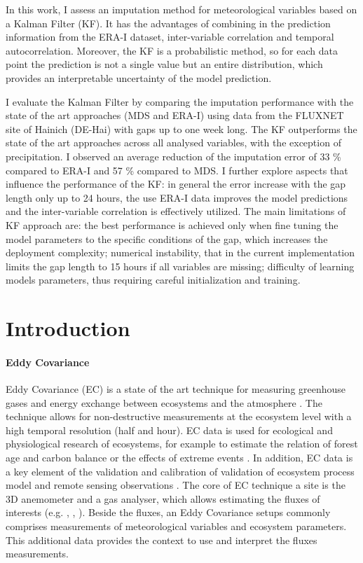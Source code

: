 \documentclass{article}
\let\Oldsection\section
\renewcommand{\section}{\FloatBarrier\Oldsection}
\begin{document}
In this work, I assess an imputation method for meteorological variables based on a Kalman Filter (KF). It has the advantages of combining in the prediction information from the ERA-I dataset, inter-variable correlation and  temporal autocorrelation. Moreover, the KF is a probabilistic method, so for each data point the prediction is not a single value but an entire distribution, which provides an interpretable uncertainty of the model prediction.

I evaluate the Kalman Filter by  comparing the imputation performance with the state of the art approaches (MDS and ERA-I) using data from the FLUXNET site of Hainich (DE-Hai) with gaps up to one week long. The KF outperforms the state of the art approaches across all analysed variables, with the exception of precipitation. I observed an average reduction of the imputation error of 33 \% compared to ERA-I and  57 \% compared to MDS. I further explore aspects that influence the performance of the KF: in general the error increase with the gap length only up to 24 hours, the use ERA-I data improves the model predictions and the inter-variable correlation is effectively utilized.
The main limitations of KF approach are: the best performance is achieved only when fine tuning the model parameters to the specific conditions of the gap, which increases the deployment complexity; numerical instability, that in the current implementation limits the gap length to 15 hours if all variables are missing; difficulty of learning models parameters, thus requiring careful initialization and training.

\section{Introduction}

\paragraph{Eddy Covariance} Eddy Covariance (EC) is a state of the art technique for measuring greenhouse gases and energy exchange between ecosystems and the atmosphere \cite{aubinet_eddy_2012-1}.  The technique allows for non-destructive measurements at the ecosystem level with a high temporal resolution (half and hour). EC data is used for ecological and physiological research of ecosystems, for example to estimate the relation of forest age and carbon balance \cite{besnard_quantifying_2018} or the effects of extreme events \cite{mahecha_detecting_2017}. In addition, EC data is a key element of the validation and calibration of validation of ecosystem process model and remote sensing observations \cite{papale_ideas_2020}.
The core of EC technique a site is the 3D anemometer and a gas analyser, which allows estimating the fluxes of interests (e.g. , , ). Beside the fluxes, an Eddy Covariance setups commonly comprises measurements of meteorological variables and ecosystem parameters. This additional data provides the context to use and interpret the fluxes measurements.
\end{document}
